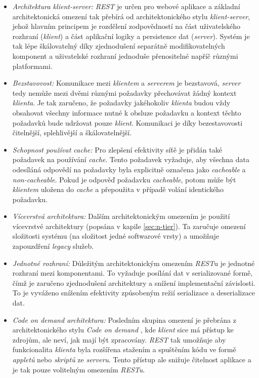 \begin{itemize}
  \item{\textit{Architektura klient-server:}} \textit{REST} je určen pro webové aplikace a základní architektonická omezení tak přebírá od architektonického stylu \textit{klient-server}, jehož hlavním principem je rozdělení zodpovědností na část uživatelského rozhraní (\textit{klient}) a část aplikační logiky a persistence dat (\textit{server}). Systém je tak lépe škálovatelný díky zjednodušení separátně modifikovatelných komponent \cite{Pautasso08} a uživatelské rozhraní jednoduše přenositelné napříč různými platformami.
  \item{\textit{Bezstavovost:}} Komunikace mezi \textit{klientem} a \textit{serverem} je bezstavová, \textit{server} tedy nemůže mezi dvěmi různými požadavky přechovávat žádný kontext \textit{klienta}. Je tak zaručeno, že požadavky jakéhokoliv \textit{klienta} budou vždy obsahovat všechny informace nutné k obsluze požadavku a kontext těchto požadavků bude udržovat pouze \textit{klient}.
  Komunikaci je díky bezestavovosti čitelnější, splehlivější a škálovatelnější.
  \item{\textit{Schopnost používat cache:}} Pro zlepšení efektivity síťě je přidán také požadavek na používání \textit{cache}. Tento požadavek vyžaduje, aby všechna data odesíláná odpovědí na požadavky byla explicitně označena jako \textit{cacheable} a \textit{non-cacheable}. Pokud je odpověď požadavku \textit{cacheable}, potom může být \textit{klientem} uložena do \textit{cache} a přepoužita v případě volání identického požadavku.
  \item{\textit{Vícevrstvá architektura:}} Dalším architektonickým omezením je použití vícevrstvé architektury (popsána v kapile \ref{sec:n-tier}). Ta zaručuje omezení složitosti systému (na složitost jedné softwarové vrsty) a umožňuje zapouzdření \textit{legacy} služeb.
  \item{\textit{Jednotné rozhraní:}} Důležitým architektonickým omezením \textit{REST}u je jednotné rozhraní mezi komponentami. To vyžaduje posílání dat v serializované formě, čímž je zaručeno zjednodušení architektury a snížení implementační závislosti. To je vyváženo snížením efektivity způsobeným režií serializace a deserializace dat.
  \item{\textit{Code on demand architektura:}} Posledním skupina omezení je přebrána z architektonického stylu \textit{Code on demand} \cite{Fuggetta98}, kde \textit{klient} sice má přístup ke zdrojům, ale neví, jak mají být zpracovány. \textit{REST} tak umožňuje aby funkcionalita \textit{klienta} byla rozšířena stažením a spuštěním kódu ve formě \textit{appletů} nebo \textit{skriptů} ze \textit{serveru}. Tento přístup ale snižuje čitelnost aplikace a je tak pouze volitelným omezením \textit{RESTu}.
\end{itemize}

